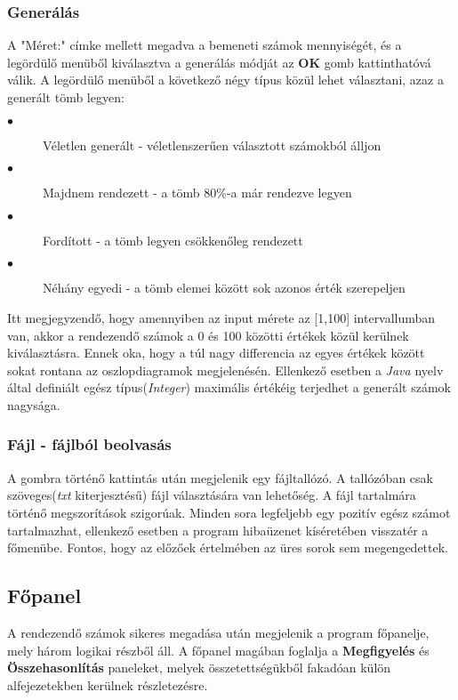 \documentclass{elteikthesis}
\begin{document}
\subsubsection{Generálás}
A "Méret:" címke mellett megadva a bemeneti számok mennyiségét, és a legördülő menüből kiválasztva a generálás módját az \textbf{OK} gomb kattinthatóvá válik. A legördülő menüből a következő négy típus közül lehet választani, azaz a generált tömb legyen:
\begin{description}
	\item[$\bullet$] Véletlen generált - véletlenszerűen választott számokból álljon
	\item[$\bullet$] Majdnem rendezett - a tömb 80\%-a már rendezve legyen
	\item[$\bullet$] Fordított - a tömb legyen csökkenőleg rendezett
	\item[$\bullet$] Néhány egyedi - a tömb elemei között sok azonos érték szerepeljen
\end{description}
Itt megjegyzendő, hogy amennyiben az input mérete az [1,100] intervallumban van, akkor a rendezendő számok a 0 és 100 közötti értékek közül kerülnek kiválasztásra. Ennek oka, hogy a túl nagy differencia az egyes értékek között sokat rontana az oszlopdiagramok megjelenésén. Ellenkező esetben a \emph{Java} nyelv által definiált egész típus(\emph{Integer}) maximális értékéig terjedhet a generált számok nagysága.
 
\subsubsection{Fájl - fájlból beolvasás}
A gombra történő kattintás után megjelenik egy fájltallózó. A tallózóban csak szöveges(\emph{txt} kiterjesztésű) fájl választására van lehetőség. A fájl tartalmára történő megszorítások szigorúak. Minden sora legfeljebb egy pozitív egész számot tartalmazhat, ellenkező esetben a program hibaüzenet kíséretében visszatér a főmenübe. Fontos, hogy az előzőek értelmében az üres sorok sem megengedettek.

\subsection{Főpanel}
A rendezendő számok sikeres megadása után megjelenik a program főpanelje, mely három logikai részből áll. A főpanel magában foglalja a \textbf{Megfigyelés} és \textbf{Összehasonlítás} paneleket, melyek összetettségükből fakadóan külön alfejezetekben kerülnek részletezésre.
\end{document}
